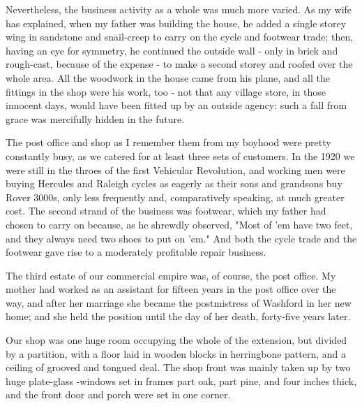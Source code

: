 Nevertheless, the business activity as a whole was much more varied. As my wife has explained, when my father was building the house, he added a single storey wing in sandstone and snail-creep to carry on the cycle and footwear trade; then, having an eye for symmetry, he continued the outside wall - only in brick and rough-cast, because of the expense - to make a second storey and roofed over the whole area. All the woodwork in the house came from his plane, and all the fittings in the shop were his work, too - not that any village store, in those innocent days, would have been fitted up by an outside agency: such a fall from grace was mercifully hidden in the future.

The post office and shop as I remember them from my boyhood were pretty constantly busy, as we catered for at least three sets of customers. In the 1920 we were still in the throes of the first Vehicular Revolution, and working men were buying Hercules and Raleigh cycles as eagerly as their sons and grandsons buy Rover 3000s, only less frequently and, comparatively speaking, at much greater cost. The second strand of the business was footwear, which my father had chosen to carry on because, as he shrewdly observed, "Most of ’em have two feet, and they always need two shoes to put on 'em." And both the cycle trade and the footwear gave rise to a moderately profitable repair business.

The third estate of our commercial empire was, of course, the post office. My mother had worked as an assistant for fifteen years in the post office over the way, and after her marriage she became the postmistress of Washford in her new home; and she held the position until the day of her death, forty-five years later.

Our shop was one huge room occupying the whole of the extension, but divided by a partition, with a floor laid in wooden blocks in herringbone pattern, and a ceiling of grooved and tongued deal. The shop front was mainly taken up by two huge plate-glass -windows set in frames part oak, part pine, and four inches thick, and the front door and porch were set in one corner.

